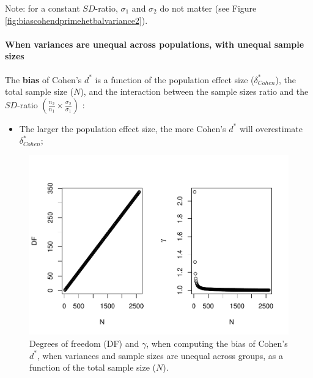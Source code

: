 \documentclass[
  english,
  man,mask]{apa6}
\providecommand{\tightlist}{%
  \setlength{\itemsep}{0pt}\setlength{\parskip}{0pt}}
\let\oldparagraph\paragraph
\renewcommand{\paragraph}[1]{\oldparagraph{#1}\mbox{}}
\begin{document}
Note: for a constant \(SD\)-ratio, \(\sigma_1\) and \(\sigma_2\) do not matter (see Figure \ref{fig:biascohendprimehetbalvariance2}).

\hypertarget{when-variances-are-unequal-across-populations-with-unequal-sample-sizes}{%
\paragraph{When variances are unequal across populations, with unequal sample sizes}\label{when-variances-are-unequal-across-populations-with-unequal-sample-sizes}}

The \textbf{bias} of Cohen's \(d^*\) is a function of the population effect size (\(\delta^*_{Cohen}\)), the total sample size (\(N\)), and the interaction between the sample sizes ratio and the \(SD\)-ratio \(\left(\frac{n_2}{n_1}\times\frac{\sigma_2}{\sigma_1} \right)\) :

\begin{itemize}
\tightlist
\item
  The larger the population effect size, the more Cohen's \(d^*\) will overestimate \(\delta^*_{Cohen}\);
\end{itemize}

\begin{figure}
\centering
\includegraphics{Theoretical-Bias-of-all-estimators-as-a-function-of-population-parameters_files/figure-latex/biascohendprimehetunbalNsize2-1.pdf}
\caption{\label{fig:biascohendprimehetunbalNsize2}Degrees of freedom (DF) and \(\gamma\), when computing the bias of Cohen's \(d^*\), when variances and sample sizes are unequal across groups, as a function of the total sample size (\(N\)).}
\end{figure}
\end{document}
